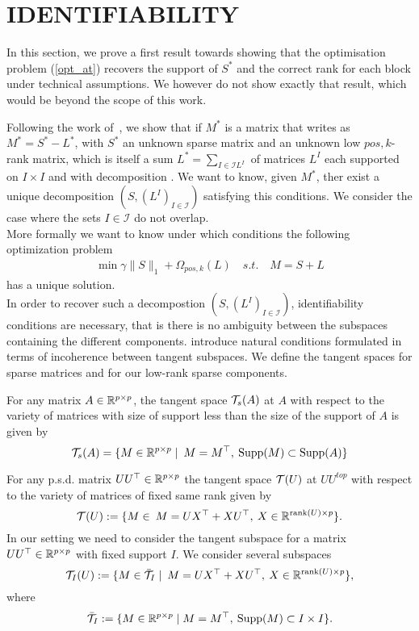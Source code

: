 \section{IDENTIFIABILITY}
\label{sec:id}

In this section, we prove a first result towards showing that the optimisation problem (\ref{opt_at}) recovers the support of $S^*$ and the correct rank for each block under technical assumptions. We however do not show exactly that result, which would be beyond the scope of this work. 

Following the work of~\citet{chandrasekaran2011rank}, we show that if  $M^{\ast}$ is a matrix that writes as  $M^{\ast}= S^{\ast}-L^{\ast}$, with $S^{\ast}$ an unknown sparse matrix and an unknown  low $pos,k$-rank matrix, which is itself a sum $L^{\ast}=\sum_{I\in\mathcal{I}L^{I}}$ of matrices $L^{I}$ each supported on $I \times I$ and with decomposition . We want to know, given $M^{\ast}$, ther exist a unique decomposition $\left(S,(L^{I})_{I\in\mathcal{I}}\right)$ satisfying this conditions. We consider the case where the sets $I\in\mathcal{I}$ do not overlap.  \\

More formally we want to know under which conditions the following optimization problem 
\begin{align}
\min \gamma\|S\|_1+\Omega_{pos,k}(L) \quad s.t. \quad M=S+L
\end{align}
has a unique solution.\\

In order to recover such a decompostion  $\left(S,(L^{I})_{I\in\mathcal{I}}\right)$, identifiability conditions are necessary, that is there is no ambiguity between the subspaces containing the different components.  \citet{chandrasekaran2011rank} introduce natural conditions formulated in terms of incoherence between tangent subspaces. We define the tangent spaces for sparse matrices and for our low-rank sparse components.

For any matrix $A\in\mathbb{R}^{p\times p}$, the tangent space $\mathcal{T}_s(A)$ at $A$ with respect to the variety of matrices with size of support less than the size of the support of $A$ is given by
$$
\mathcal{T}_s(A)=\{M \in \mathbb{R}^{p \times p}\mid  \: M=M^\top, \: {\rm Supp}(M)\subset {\rm Supp}(A)\}
$$

For any p.s.d. matrix $UU^{\top}\in\mathbb{R}^{p\times p}$  the tangent space $\mathcal{T}(U)$ at $UU^{top}$ with respect to the variety of matrices of fixed same rank given by
$$
\mathcal{T}(U):=\{M \in \: M=UX^\top+XU^\top,\: X \in \mathbb{R}^{\text{rank}(U) \times p} \}.
$$
In our setting we need to consider the tangent subspace for a matrix $UU^{\top}\in\mathbb{R}^{p\times p}$ with fixed support $I$.
We consider several subspaces
$$\mathcal{T}_I(U):=\{M \in \bar{\mathcal{T}}_I\mid \: M=UX^\top+XU^\top,\: X \in \mathbb{R}^{\text{rank}(U) \times p} \},$$
where 
$$
\bar{\mathcal{T}}_I:=\{M \in \mathbb{R}^{p \times p}\mid  M=M^\top, \: {\rm Supp}(M)\subset I \times I\}.
$$

